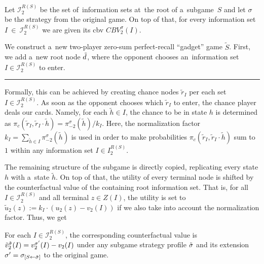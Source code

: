 Let $\mathcal{I}_2^{R(S)}$ be the set of~information sets at~the root of a~subgame~$S$ and let $\sigma$ be the strategy from the original game.
On top of that, for every information set~$I~\in~\mathcal{I}_2^{R(S)}$ we are given its \acrlong{cbv} $CBV_2^{\sigma}(I)$.

We construct a~new two-player zero-sum perfect-recall ``gadget'' game $\tilde{S}$.
First, we add a~new root node $\tilde{d}$, where the opponent chooses an~information set $I \in \mathcal{I}_2^{R(S)}$ to enter.
\hrule
\todo
Formally, this can be achieved by creating chance nodes $\tilde{r}_I$ per each set $I \in \mathcal{I}_2^{R(S)}$.
As soon as the opponent chooses which $\tilde{r}_I$ to enter, the chance player deals our cards.
Namely, for each $\tilde{h}\in I$, the chance to be in state $h$ is determined as
$\pi_c (\tilde{r}_I, \tilde{r}_I \cdot \tilde{h}) = \pi_{-2} ^{\sigma}(\tilde{h}) / k_I$.
Here, the normalization factor $k_I = \sum_{ \tilde{h} \in I} \pi_{-2}^\sigma(\tilde{h})$ is used in order to make probabilities
$\pi_c (\tilde{r}_I, \tilde{r}_I \cdot \tilde{h})$ sum to $1$ within any information set $I \in I_2 ^{R(S)}$.

The remaining structure of the subgame is directly copied, replicating every state $h$ with a~state $\tilde{h}$.
On top of that, the utility of every terminal node is shifted by the counterfactual value of the containing root information set.
That is, for all $I \in \mathcal{I}_2^{R(S)}$ and all terminal $z \in Z(I)$, the utility is set to
$\tilde{u}_2(z) := k_I \cdot \left(u_2(z) - v_2(I)\right)$ if we also take into account the normalization factor.
Thus, we get
\begin{lem}
  \label{lem:cfshift}
  For each $I\in\mathcal{I}_2^{R(S)}$, the corresponding counterfactual value is
  $\tilde{v}_2 ^{\tilde{\sigma}}(I) = v_2 ^{\sigma'}(I) - v_2(I)$
  under any subgame strategy profile ${\tilde{\sigma}}$ and its extension
  $\sigma' = \sigma_{[S \leftarrow {\tilde{\sigma}}]}$ to the original game.
\end{lem}

